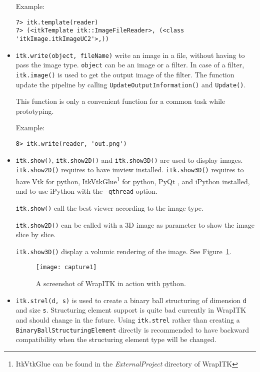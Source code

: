 \documentclass{InsightArticle}
\begin{document}
\begin{itemize}
Example:
\begin{verbatim}
7> itk.template(reader)
7> (<itkTemplate itk::ImageFileReader>, (<class 'itkImage.itkImageUC2'>,))
\end{verbatim}

  \item \verb$itk.write(object, fileName)$ write an image in a file, without
having to pass the image type.
\verb$object$ can be an image or a filter. In case of a filter, \verb$itk.image()$ is used
to get the output image of the filter. The function update the pipeline by calling
\verb$UpdateOutputInformation()$ and \verb$Update()$.

This function is only a convenient function for a common task while prototyping.

Example:
\begin{verbatim}
8> itk.write(reader, 'out.png')
\end{verbatim}

  \item \verb$itk.show()$, \verb$itk.show2D()$ and \verb$itk.show3D()$ are used to
display images. \verb$itk.show2D()$ requires to have imview \cite{ImviewWebSite} installed.
\verb$itk.show3D()$ requires to have Vtk for python, ItkVtkGlue\footnote{ItkVtkGlue can be found in
the {\em ExternalProject} directory of WrapITK} for python, PyQt \cite{PyQtWebSite}, and iPython
\cite{IPythonWebSite} installed, and to use iPython with the \verb$-qthread$ option.

\verb$itk.show()$ call the best viewer according to the image type.

\verb$itk.show2D()$
can be called with a 3D image as parameter to show the image slice by slice.

\verb$itk.show3D()$ display a volumic rendering of the image. See Figure~\ref{screenshot}.

\begin{figure}[htbp]
\centering
\texttt{[image: capture1]}
\caption{A screenshot of WrapITK in action with python.\label{screenshot}}
\end{figure}

  \item \verb$itk.strel(d, s)$ is used to create a binary ball structuring of dimension
\verb$d$ and size \verb$s$. Structuring element support is quite bad currently in WrapITK
and should change in the future. Using \verb$itk.strel$ rather than creating a
\verb$BinaryBallStructuringElement$ directly is recommended to have backward compatibility
when the structuring element type will be changed.


\end{itemize}
\end{document}
